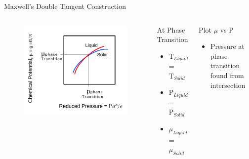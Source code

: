 \documentclass{beamer}
\begin{document}
\begin{frame}{Maxwell's Double Tangent Construction}
	\begin{columns}[t]
        \begin{figure}
            \centering
            \includegraphics[width=\columnwidth]{figs/MaxwellDTC-Fig2.pdf}
          \end{figure}
		\begin{block}{At Phase Transition}
			\begin{itemize}
				\item $\text{T}_{Liquid}$ = $\text{T}_{Solid}$
			    \item $\text{P}_{Liquid}$ = $\text{P}_{Solid}$
				\item $\mu_{Liquid}$ = $\mu_{Solid}$
			\end{itemize}
	    \end{block}
	    \begin{block}{Plot $\mu$ vs P }
			\begin{itemize}
				\item Pressure at phase transition found
				from intersection
			\end{itemize}
		\end{block}
	\end{columns}	
\end{frame}
\end{document}

